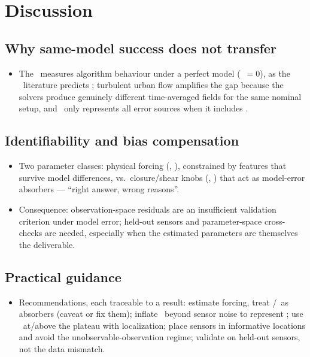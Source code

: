 \section{Discussion}
\label{sec:discussion}


\subsection{Why same-model success does not transfer}
\label{sec:discussion:whynotransfer}
\begin{itemize}
  \item The \twinexp\ measures algorithm behaviour under a perfect model
        (\discrepancy\ $= 0$), as the \invcrime\ literature predicts
        \cite{kaipio2005statistical,wirgin2004inverse}; turbulent urban flow
        amplifies the gap because the solvers produce genuinely different
        time-averaged fields for the same nominal setup, and \Cd\ only
        represents all error sources when it includes \discrepancy.
\end{itemize}

\subsection{Identifiability and bias compensation}
\label{sec:discussion:identifiability}
\begin{itemize}
  \item Two parameter classes: physical forcing (\inflowangle, \velmag),
        constrained by features that survive model differences, vs.\
        closure/shear knobs (\shearexp, \sgs) that act as model-error
        absorbers --- ``right answer, wrong reasons''.
  \item Consequence: observation-space residuals are an insufficient
        validation criterion under model error; held-out sensors and
        parameter-space cross-checks are needed, especially when the estimated
        parameters are themselves the deliverable.
\end{itemize}

\subsection{Practical guidance}
\label{sec:discussion:guidance}
\begin{itemize}
  \item Recommendations, each traceable to a result: estimate forcing, treat
        \shearexp/\sgs\ as absorbers (caveat or fix them); inflate \Cd\ beyond
        sensor noise to represent \discrepancy; use \Ne\ at/above the plateau
        with localization; place sensors in informative locations and avoid
        the unobservable-observation regime; validate on held-out sensors, not
        the data mismatch.
\end{itemize}

